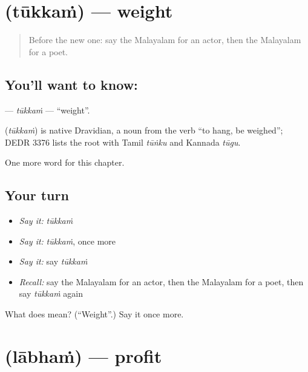 \section[\texorpdfstring{\ml{തൂക്കം} (tūkkaṁ)}{തൂക്കം (tūkkaṁ)}]{ (tūkkaṁ) — weight}

\label{lesson:ML-C300-tukkam}



\begin{quote}
Before the new one: say the Malayalam for an actor, then the Malayalam for a poet.
\end{quote}

\subsection*{You'll want to know: }
\textbf{} — \emph{tūkkaṁ} — \textquotedblleft{}weight\textquotedblright{}.

\begin{cousinweb}
\textbf{} (\emph{tūkkaṁ}) is native Dravidian, a noun from the verb \textquotedblleft{}to hang, be weighed\textquotedblright{}; DEDR 3376 lists the root with Tamil \emph{tūṅku} and Kannada \emph{tūgu}.
\end{cousinweb}

\begin{grammarlens}[title={What you've built}]
One more word for this chapter.
\end{grammarlens}

\subsection*{Your turn}
\begin{itemize}
\raggedright
  \item \emph{Say it:} \emph{tūkkaṁ}
  \item \emph{Say it:} \emph{tūkkaṁ}, once more
  \item \emph{Say it:} say \emph{tūkkaṁ}
  \item \emph{Recall:} say the Malayalam for an actor, then the Malayalam for a poet, then say \emph{tūkkaṁ} again
\end{itemize}

\begin{tcolorbox}[breakable,colback=teal!4,colframe=teal!35!black,title={Before you move on}]
What does  mean? (\textquotedblleft{}Weight\textquotedblright{}.) Say it once more.
\end{tcolorbox}
\section[\texorpdfstring{\ml{ലാഭം} (lābhaṁ)}{ലാഭം (lābhaṁ)}]{ (lābhaṁ) — profit}

